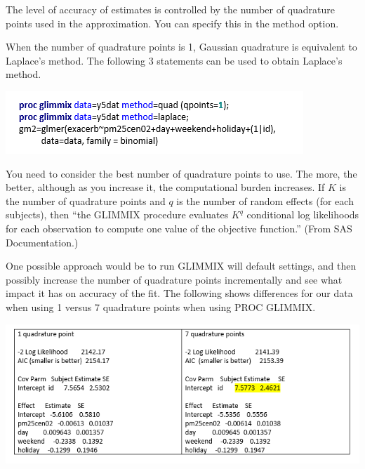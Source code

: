 \documentclass[
  9pt,
  ignorenonframetext,
]{beamer}
\begin{document}
\begin{frame}{}
\protect\hypertarget{section-5}{}
The level of accuracy of estimates is controlled by the number of
quadrature points used in the approximation. You can specify this in the
method option.

When the number of quadrature points is 1, Gaussian quadrature is
equivalent to Laplace's method. The following 3 statements can be used
to obtain Laplace's method.

\begin{center}\includegraphics[width=0.7\linewidth]{figs_L15/f3} \end{center}

You need to consider the best number of quadrature points to use. The
more, the better, although as you increase it, the computational burden
increases. If \(K\) is the number of quadrature points and \(q\) is the
number of random effects (for each subjects), then ``the GLIMMIX
procedure evaluates \(K^q\) conditional log likelihoods for each
observation to compute one value of the objective function.'' (From SAS
Documentation.)
\end{frame}

\begin{frame}{}
\protect\hypertarget{section-6}{}
One possible approach would be to run GLIMMIX will default settings, and
then possibly increase the number of quadrature points incrementally and
see what impact it has on accuracy of the fit. The following shows
differences for our data when using 1 versus 7 quadrature points when
using PROC GLIMMIX.

\begin{center}\includegraphics[width=0.7\linewidth]{figs_L15/f4} \end{center}
\end{frame}
\end{document}
